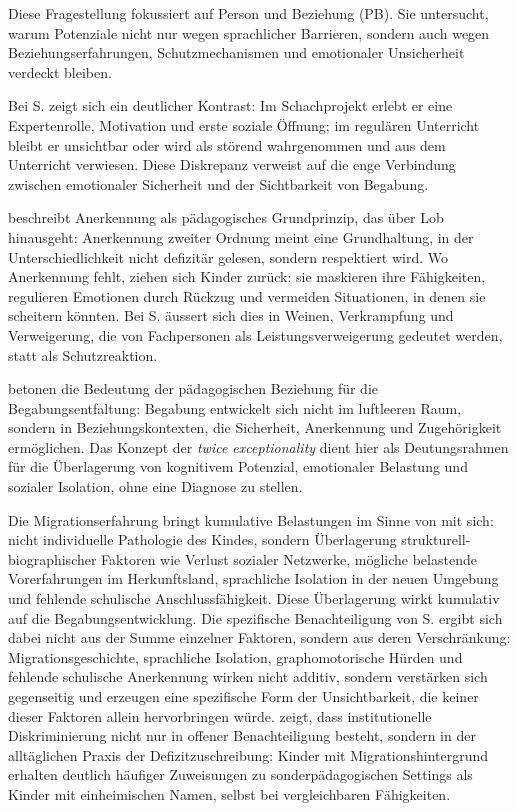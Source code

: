 \documentclass[ngerman, a4paper]{article}
\begin{document}
 
Diese Fragestellung fokussiert auf Person und Beziehung (PB). Sie untersucht, warum
Potenziale nicht nur wegen sprachlicher Barrieren, sondern auch wegen
Beziehungserfahrungen, Schutzmechanismen und emotionaler Unsicherheit verdeckt bleiben.
 
Bei S. zeigt sich ein deutlicher Kontrast: Im Schachprojekt erlebt er eine Expertenrolle,
Motivation und erste soziale Öffnung; im regulären Unterricht bleibt er unsichtbar oder
wird als störend wahrgenommen und aus dem Unterricht verwiesen. Diese Diskrepanz
verweist auf die enge Verbindung zwischen emotionaler Sicherheit und der Sichtbarkeit
von Begabung.
 
\textcite{grossrieder2010anerkennung} beschreibt Anerkennung als pädagogisches Grundprinzip, das über Lob
hinausgeht: Anerkennung zweiter Ordnung meint eine Grundhaltung, in der Unterschiedlichkeit
nicht defizitär gelesen, sondern respektiert wird.
Wo Anerkennung fehlt, ziehen sich Kinder zurück: sie maskieren ihre Fähigkeiten,
regulieren Emotionen durch Rückzug und vermeiden Situationen, in denen sie scheitern
könnten. Bei S. äussert sich dies in Weinen, Verkrampfung und Verweigerung, die von
Fachpersonen als Leistungsverweigerung gedeutet werden, statt als Schutzreaktion.
 
\textcite[S.\,35--57]{kuhl2019diversitaet} betonen die Bedeutung der pädagogischen Beziehung für die
Begabungsentfaltung: Begabung entwickelt sich nicht im luftleeren Raum, sondern in
Beziehungskontexten, die Sicherheit, Anerkennung und Zugehörigkeit ermöglichen. Das Konzept der \textit{twice exceptionality} dient
hier als Deutungsrahmen für die Überlagerung von kognitivem Potenzial, emotionaler
Belastung und sozialer Isolation, ohne eine Diagnose zu stellen.
 
Die Migrationserfahrung bringt kumulative Belastungen im Sinne von \textcite[S.\,86--98]{behrensen2019inklusive}
mit sich: nicht individuelle Pathologie des Kindes, sondern Überlagerung
strukturell-biographischer Faktoren wie Verlust sozialer Netzwerke, mögliche
belastende Vorerfahrungen im Herkunftsland, sprachliche Isolation in der
neuen Umgebung und fehlende schulische Anschlussfähigkeit. Diese
Überlagerung wirkt kumulativ auf die Begabungsentwicklung.
Die spezifische Benachteiligung von S. ergibt sich dabei nicht aus der Summe
einzelner Faktoren, sondern aus deren Verschränkung: Migrationsgeschichte,
sprachliche Isolation, graphomotorische Hürden und fehlende schulische
Anerkennung wirken nicht additiv, sondern verstärken sich gegenseitig
und erzeugen eine spezifische Form der Unsichtbarkeit, die keiner dieser
Faktoren allein hervorbringen würde.
\textcite[S.\,63--77]{kappus2010migration} zeigt, dass institutionelle Diskriminierung nicht nur in offener Benachteiligung
besteht, sondern in der alltäglichen Praxis der Defizitzuschreibung: Kinder mit
Migrationshintergrund erhalten deutlich häufiger Zuweisungen zu sonderpädagogischen
Settings als Kinder mit einheimischen Namen, selbst bei vergleichbaren Fähigkeiten.
 
\end{document}
